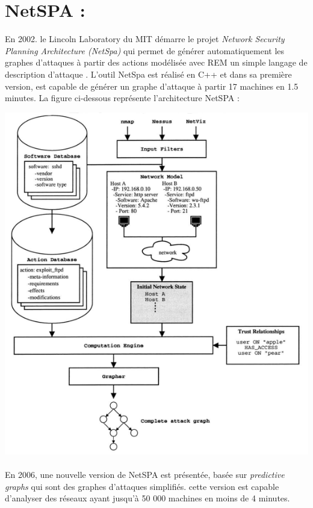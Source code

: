 \documentclass[10pt,a4paper]{article}
\begin{document}
\section{NetSPA :}
En 2002. le Lincoln Laboratory du MIT démarre le projet \textit{Network Security Planning Architecture (NetSpa)}\cite{ref5} qui permet de générer automatiquement les graphes d'attaques à partir des actions modélisée avec REM un simple langage de description d'attaque . L'outil NetSpa est réalisé en C++ et dans sa première version, est capable de générer un graphe d'attaque à partir 17 machines en 1.5 minutes. La figure ci-dessous représente l'architecture NetSPA :
\begin{center}
\includegraphics[scale=0.4]{img/NetSPA.png}
\end{center}
\paragraph{}
En 2006, une nouvelle version de NetSPA est présentée\cite{ref3}, basée sur \textit{predictive graphs} qui sont des graphes d'attaques simplifiés. cette version est capable 	d'analyser des réseaux ayant jusqu'à 50 000 machines en moins de 4 minutes.
\newpage


\end{document}
